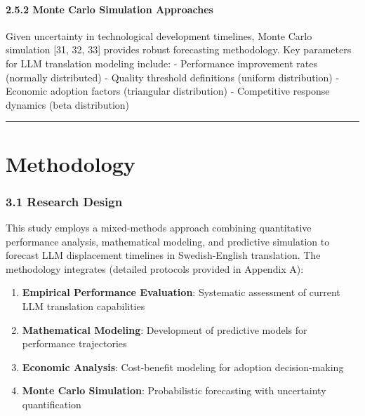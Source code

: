 \documentclass[12pt,a4paper]{article}
\providecommand{\tightlist}{%
  \setlength{\itemsep}{0pt}\setlength{\parskip}{0pt}}
\begin{document}
{\hypertarget{monte-carlo-simulation-approaches}{%
\paragraph{2.5.2 Monte Carlo Simulation
Approaches}\label{monte-carlo-simulation-approaches}}

Given uncertainty in technological development timelines, Monte Carlo
simulation {[}31, 32, 33{]} provides robust forecasting methodology. Key
parameters for LLM translation modeling include: - Performance
improvement rates (normally distributed) - Quality threshold definitions
(uniform distribution) - Economic adoption factors (triangular
distribution) - Competitive response dynamics (beta distribution)

\begin{center}\rule{0.5\linewidth}{0.5pt}\end{center}

\hypertarget{methodology}{%
\section{Methodology}

\hypertarget{research-design}{%
\subsubsection{3.1 Research Design}\label{research-design}}

This study employs a mixed-methods approach combining quantitative
performance analysis, mathematical modeling, and predictive simulation
to forecast LLM displacement timelines in Swedish-English translation.
The methodology integrates (detailed protocols provided in Appendix A):

\begin{enumerate}
\def\labelenumi{\arabic{enumi}.}
\tightlist
\item
  \textbf{Empirical Performance Evaluation}: Systematic assessment of
  current LLM translation capabilities
\item
  \textbf{Mathematical Modeling}: Development of predictive models for
  performance trajectories
\item
  \textbf{Economic Analysis}: Cost-benefit modeling for adoption
  decision-making
\item
  \textbf{Monte Carlo Simulation}: Probabilistic forecasting with
  uncertainty quantification
\end{enumerate}

}}
\end{document}
